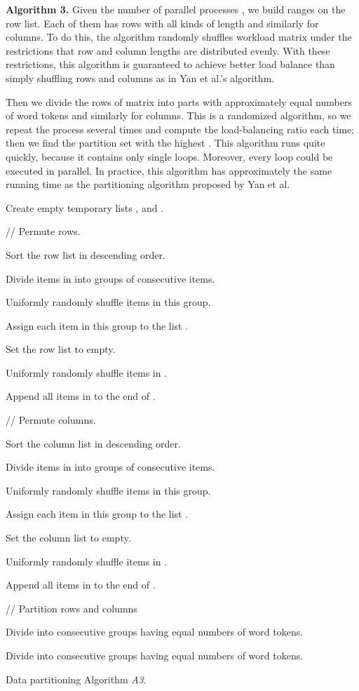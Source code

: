 \documentclass[10pt,conference]{IEEEtran}
\begin{document}
\textbf{Algorithm 3.} Given the number of parallel processes , we build  ranges on the row list. Each of them has rows with all kinds of length and similarly for columns. To do this, the algorithm randomly shuffles workload matrix  under the restrictions that row and column lengths are distributed evenly. With these restrictions, this algorithm is guaranteed to achieve better load balance than simply shuffling rows and columns as in Yan et al.'s algorithm.

Then we divide the rows of matrix  into  parts with approximately equal numbers of word tokens and similarly for columns. This is a randomized algorithm, so we repeat the process several times and compute the load-balancing ratio  each time; then we find the partition set with the highest . This algorithm runs quite quickly, because it contains only single loops. Moreover, every loop could be executed in parallel. In practice, this algorithm has approximately the same running time as the partitioning algorithm proposed by Yan et al.

\begin{algorithm} [h]


Create empty temporary lists , and .

\nonl// Permute rows.

Sort the row list  in descending order.

Divide items in  into groups of  consecutive items.

 {
	Uniformly randomly shuffle items in this group.
	
	Assign each item  in this group to the list .
}
	
Set the row list  to empty.

 {
	Uniformly randomly shuffle items in .
	
	Append all items in  to the end of .
}

\nonl// Permute columns.

Sort the column list  in descending order.

Divide items in  into groups of  consecutive items.

 {
	Uniformly randomly shuffle items in this group.
	
	Assign each item  in this group to the list .
}
	
Set the column list  to empty.

 {
	Uniformly randomly shuffle items in .
	
	Append all items in  to the end of .
}

\nonl// Partition rows and columns

Divide  into  consecutive groups  having equal numbers of word tokens.

Divide  into  consecutive groups  having equal numbers of word tokens.

\caption{Data partitioning Algorithm \textit{A3}.}	
\label{A3}
\end{algorithm}
\end{document}
